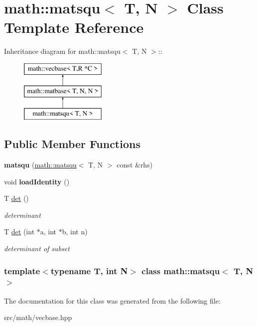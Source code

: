 \hypertarget{classmath_1_1matsqu}{
\section{math::matsqu$<$ T, N $>$ Class Template Reference}
\label{classmath_1_1matsqu}
}
Inheritance diagram for math::matsqu$<$ T, N $>$::\begin{figure}[H]
\begin{center}
\leavevmode
\includegraphics[height=3cm]{classmath_1_1matsqu}
\end{center}
\end{figure}
\subsection*{Public Member Functions}
\begin{DoxyCompactItemize}
\item 
\hypertarget{classmath_1_1matsqu_a7e6ad4a4833154d2737610cc40652b18}{
{\bfseries matsqu} (\hyperlink{classmath_1_1matsqu}{math::matsqu}$<$ T, N $>$ const \&rhs)}
\label{classmath_1_1matsqu_a7e6ad4a4833154d2737610cc40652b18}

\item 
\hypertarget{classmath_1_1matsqu_a059711412f812e56e8abb4e518460c38}{
void {\bfseries loadIdentity} ()}
\label{classmath_1_1matsqu_a059711412f812e56e8abb4e518460c38}

\item 
\hypertarget{classmath_1_1matsqu_a04647ad3f7539a9aac5654a2e569682a}{
T \hyperlink{classmath_1_1matsqu_a04647ad3f7539a9aac5654a2e569682a}{det} ()}
\label{classmath_1_1matsqu_a04647ad3f7539a9aac5654a2e569682a}

\begin{DoxyCompactList}\small\item\em determinant \item\end{DoxyCompactList}\item 
\hypertarget{classmath_1_1matsqu_a5a63541112ab40372e761931e7843727}{
T \hyperlink{classmath_1_1matsqu_a5a63541112ab40372e761931e7843727}{det} (int $\ast$a, int $\ast$b, int n)}
\label{classmath_1_1matsqu_a5a63541112ab40372e761931e7843727}

\begin{DoxyCompactList}\small\item\em determinant of subset \item\end{DoxyCompactList}\end{DoxyCompactItemize}
\subsubsection*{template$<$typename T, int N$>$ class math::matsqu$<$ T, N $>$}



The documentation for this class was generated from the following file:\begin{DoxyCompactItemize}
\item 
src/math/vecbase.hpp\end{DoxyCompactItemize}
